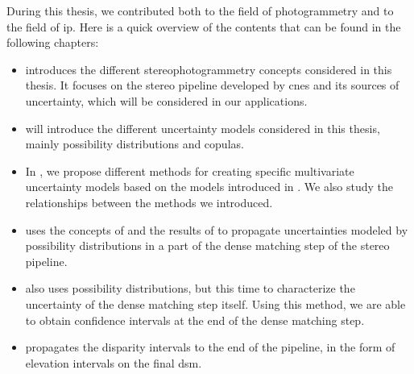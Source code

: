 During this thesis, we contributed both to the field of photogrammetry and to the field of \acrshort{ip}. Here is a quick overview of the contents that can be found in the following chapters:
\begin{itemize}
    \item {} introduces the different stereophotogrammetry concepts considered in this thesis. It focuses on the stereo pipeline developed by \acrshort{cnes} and its sources of uncertainty, which will be considered in our applications.
    \item {} will introduce the different uncertainty models considered in this thesis, mainly possibility distributions and copulas.
    \item In , we propose different methods for creating specific multivariate uncertainty models based on the models introduced in . We also study the relationships between the methods we introduced.
    \item {} uses the concepts of  and the results of  to propagate uncertainties modeled by possibility distributions in a part of the dense matching step of the stereo pipeline.
    \item {} also uses possibility distributions, but this time to characterize the uncertainty of the dense matching step itself. Using this method, we are able to obtain confidence intervals at the end of the dense matching step. 
    \item {} propagates the disparity intervals to the end of the pipeline, in the form of elevation intervals on the final \acrshort{dsm}. 
\end{itemize}

